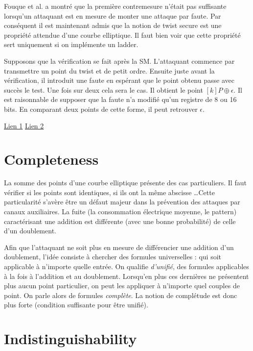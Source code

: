 \documentclass[a4paper]{report}
\begin{document}
Fouque et al. a montré que la première contremesure n'était pas suffisante lorsqu'un attaquant est en mesure de monter une attaque par faute. Par conséquent il est maintenant admis que la notion de twist secure est une propriété attendue d'une courbe elliptique. Il faut bien voir que cette propriété sert uniquement si on implémente un ladder.

Supposons que la vérification se fait après la SM. L'attaquant commence par transmettre un point du twist et de petit ordre. Ensuite juste avant la vérification, il introduit une faute en espérant que le point obtenu passe avec succès le test. Une fois sur deux cela sera le cas. Il obtient le point $[k]P \oplus \epsilon$. Il est raisonnable de supposer que la faute n'a modifié qu'un registre de 8 ou 16 bits. En comparant deux points de cette forme, il peut retrouver $\epsilon$.



\href{http://crypto.stackexchange.com/questions/19878/what-are-these-twist-attacks-with-cost-258-4-on-nist-p-224-curve-and-when}{Lien 1}
\href{http://crypto.stackexchange.com/questions/19877/understanding-twist-security-with-respect-to-short-weierstrass-curves}{Lien 2}

\section{Completeness}
La somme des points d'une courbe elliptique présente des cas particuliers. Il faut vérifier si les points sont identiques, si ils ont la même abscisse \ldots Cette particularité s'avère être un défaut majeur dans la prévention des attaques par canaux auxiliaires. La fuite (la consommation électrique moyenne, le pattern) caractérisant une addition est différente (avec une bonne probabilité) de celle d'un doublement. 

Afin que l'attaquant ne soit plus en mesure de différencier une addition d'un doublement, l'idée consiste à chercher des formules universelles : qui soit applicable à n'importe quelle entrée. On qualifie \emph{d'unifié}, des formules applicables à la fois à l'addition et au doublement. Lorsqu'en plus ces dernières ne présentent plus aucun point particulier, on peut les appliquer à n'importe quel couples de point. On parle alors de formules \emph{complète}. La notion de complétude est donc plus forte (condition suffisante pour être unifié). 



\section{Indistinguishability}
\end{document}
